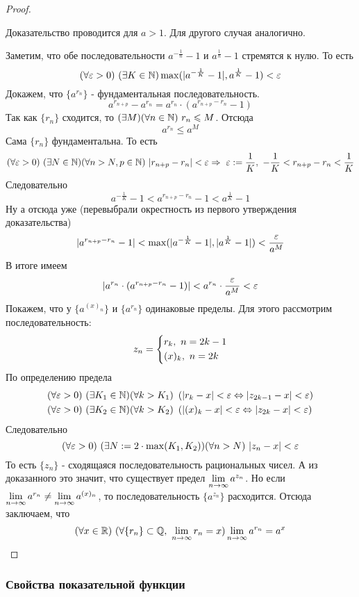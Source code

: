 \begin{proof}~
	
	Доказательство проводится для $a > 1$. Для другого случая аналогично.
	
	Заметим, что обе последовательности $a^{-\frac{1}{n}} - 1$ и $a^{\frac{1}{n}} - 1$ стремятся к нулю. То есть
	\[
		(\forall \varepsilon > 0)\ (\exists K \in \mathbb{N})  \max(|a^{-\frac{1}{K}} - 1|, a^{\frac{1}{K}} - 1) < \varepsilon
	\]
	Докажем, что $\{a^{r_n}\}$ - фундаментальная последовательность.
	\[
		a^{r_{n + p}} - a^{r_n} = a^{r_n} \cdot (a^{r_{n + p} - r_n} - 1)
	\]
	Так как $\{r_n\}$ сходится, то $(\exists M)  (\forall n \in \N)\ r_n \le M$. Отсюда
	\[
		a^{r_n} \le a^M
	\]
	Сама $\{r_n\}$ фундаментальна. То есть
	\[
		(\forall \varepsilon > 0)\ (\exists N \in \mathbb{N})  (\forall n > N, p \in \mathbb{N})\ |r_{n + p} - r_n| < \varepsilon \Rightarrow\ \varepsilon := \frac{1}{K},\ -\frac{1}{K} < r_{n + p} - r_n < \frac{1}{K}
	\]
	Следовательно
	\[
		a^{-\frac{1}{K}} - 1 < a^{r_{n + p} - r_n} - 1 < a^{\frac{1}{K}} - 1
	\]
	Ну а отсюда уже (перевыбрали окрестность из первого утверждения доказательства)
	\[
		|a^{r_{n + p} - r_n} - 1| < \max(|a^{-\frac{1}{K}} - 1|, |a^{\frac{1}{K}} - 1|) < \frac{\varepsilon}{a^M}
	\]
	В итоге имеем
	\[
		|a^{r_n} \cdot (a^{r_{n + p} - r_n} - 1)| < a^{r_n} \cdot \frac{\varepsilon}{a^M} < \varepsilon
	\]
	Покажем, что у $\{a^{(x)_n}\}$ и $\{a^{r_n}\}$ одинаковые пределы. Для этого рассмотрим последовательность:
	\[
		z_n = \left\{\begin{aligned}
			&{r_k,\ n = 2k - 1}
			\\
			&{(x)_k,\ n = 2k}
		\end{aligned}\right.
	\]
	По определению предела
	\begin{align*}
		&(\forall \varepsilon > 0)\ (\exists K_1 \in \mathbb{N})  (\forall k > K_1)\ \left(|r_k - x| < \varepsilon \Leftrightarrow |z_{2k - 1} - x| < \varepsilon\right)
		\\
		&(\forall \varepsilon > 0)\ (\exists K_2 \in \mathbb{N})  (\forall k > K_2)\ \left(|(x)_k - x| < \varepsilon \Leftrightarrow |z_{2k} - x| < \varepsilon\right)
	\end{align*}
	Следовательно
	\[
		(\forall \varepsilon > 0)\ (\exists N := 2 \cdot \max(K_1, K_2))  (\forall n > N)\ |z_n - x| < \varepsilon
	\]
	То есть $\{z_n\}$ - сходящаяся последовательность рациональных чисел. А из доказанного это значит, что существует предел $\lim\limits_{n \to \infty} a^{z_n}$. Но если $\lim\limits_{n \to \infty} a^{r_n} \neq \lim\limits_{n \to \infty} a^{(x)_n}$, то последовательность $\{a^{z_n}\}$ расходится. Отсюда заключаем, что
	\[
		(\forall x \in \mathbb{R})\ (\forall \{r_n\} \subset \mathbb{Q},\ \lim\limits_{n \to \infty} r_n = x) \lim\limits_{n \to \infty} a^{r_n} = a^x
	\]
\end{proof}

\subsubsection*{Свойства показательной функции}

